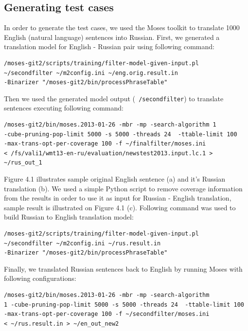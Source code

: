 \subsection{Generating test cases}

In order to generate the test cases, we used the Moses toolkit to translate 1000 English (natural language) sentences into Russian. First, we generated a translation model for English - Russian pair using following command:

\begin{verbatim}
/moses-git2/scripts/training/filter-model-given-input.pl 
~/secondfilter ~/m2config.ini ~/eng.orig.result.in 
-Binarizer "/moses-git2/bin/processPhraseTable"
\end{verbatim} 

Then we used the generated model output (\texttt{~/secondfilter}) to translate sentences executing following command:

\begin{verbatim}
/moses-git2/bin/moses.2013-01-26 -mbr -mp -search-algorithm 1 
-cube-pruning-pop-limit 5000 -s 5000 -threads 24  -ttable-limit 100
-max-trans-opt-per-coverage 100 -f ~/finalfilter/moses.ini 
< /fs/vali1/wmt13-en-ru/evaluation/newstest2013.input.lc.1 > ~/rus_out_1
\end{verbatim} 

Figure 4.1 illustrates sample original English sentence (a) and it's Russian translation (b). We used a simple Python script to remove coverage information from the results in order to use it as input for Russian - English translation, sample result is illustrated on Figure 4.1 (c). Following command was used to build Russian to English translation model:

\begin{verbatim}
/moses-git2/scripts/training/filter-model-given-input.pl 
~/secondfilter ~/m2config.ini ~/rus.result.in 
-Binarizer "/moses-git2/bin/processPhraseTable"
\end{verbatim} 

Finally, we translated Russian sentences back to English by running Moses with following configurations:

\begin{verbatim}
/moses-git2/bin/moses.2013-01-26 -mbr -mp -search-algorithm 
1 -cube-pruning-pop-limit 5000 -s 5000 -threads 24  -ttable-limit 100
-max-trans-opt-per-coverage 100 -f ~/secondfilter/moses.ini 
< ~/rus.result.in > ~/en_out_new2
\end{verbatim} 

